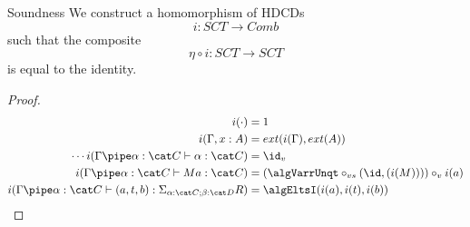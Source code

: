 \begin{construction}{Soundness}
  We construct a homomorphism of HDCDs
  \[ i : SCT \to Comb \]
  such that the composite
  \[ \eta \circ i : SCT \to SCT \]
  is equal to the identity.
\end{construction}
\begin{proof}
  \begin{align*}
    i(\cdot) &= 1\\
    i(\Gamma,x:A)  &= ext(i(\Gamma),ext(A))\\
    \cdots
    i(\Gamma \pipe \alpha:\cat C \vdash \alpha:\cat C) &= \id_v\\
    i(\Gamma \pipe \alpha:\cat C \vdash M a :\cat C) &= (\algVarrUnqt \circ_{vs} (\id, (i(M)))) \circ_v i(a)\\
    i(\Gamma \pipe \alpha:\cat C \vdash (a,t,b) : \Sigma_{\alpha:\cat C;\beta:\cat D} R) &= \algEltsI(i(a),i(t),i(b))\\
  \end{align*}
\end{proof}

